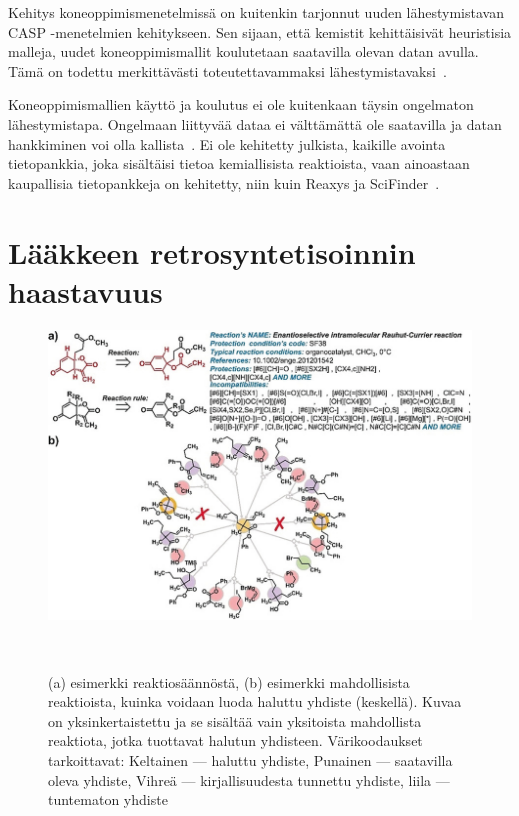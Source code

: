 \documentclass[finnish,twoside,censored,tkt,sw-line]{HYthesisML}
\begin{document}
Kehitys koneoppimismenetelmissä on kuitenkin tarjonnut uuden lähestymistavan CASP -menetelmien kehitykseen.
Sen sijaan, että kemistit kehittäisivät heuristisia malleja, uudet koneoppimismallit koulutetaan saatavilla olevan datan avulla.
Tämä on todettu merkittävästi toteutettavammaksi lähestymistavaksi~\cite{ColeyConnorW2018MLiC}.

Koneoppimismallien käyttö ja koulutus ei ole kuitenkaan täysin ongelmaton lähestymistapa.
Ongelmaan liittyvää dataa ei välttämättä ole saatavilla ja datan hankkiminen voi olla kallista~\cite{deAlmeidaA.Filipa2019Socd}.
Ei ole kehitetty julkista, kaikille avointa tietopankkia, joka sisältäisi tietoa kemiallisista reaktioista, vaan ainoastaan kaupallisia tietopankkeja on kehitetty, niin kuin Reaxys ja SciFinder~\cite{deAlmeidaA.Filipa2019Socd}.

\section{Lääkkeen retrosyntetisoinnin haastavuus}

\begin{figure}[ht]
    \centering
    \includegraphics[width=\textwidth]{retrosynthesis.jpg}
    \caption{(a) esimerkki reaktiosäännöstä, (b) esimerkki mahdollisista reaktioista, kuinka voidaan luoda haluttu yhdiste (keskellä).
        Kuvaa on yksinkertaistettu ja se sisältää vain yksitoista mahdollista reaktiota, jotka tuottavat halutun yhdisteen.
        Värikoodaukset tarkoittavat: Keltainen --- haluttu yhdiste, Punainen --- saatavilla oleva yhdiste, Vihreä --- kirjallisuudesta tunnettu yhdiste, liila --- tuntematon yhdiste}
    {~\cite{ExpertKnowledgeRetorsynthesis}}
\end{figure}
\end{document}
